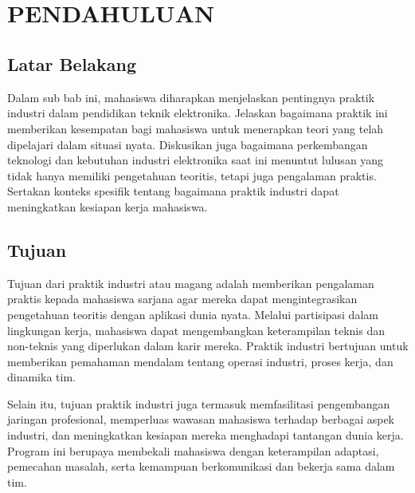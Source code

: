
\chapter[PENDAHULUAN]{\\ PENDAHULUAN}

\section{Latar Belakang}
Dalam sub bab ini, mahasiswa diharapkan menjelaskan pentingnya praktik industri dalam pendidikan teknik elektronika. Jelaskan bagaimana praktik ini memberikan kesempatan bagi mahasiswa untuk menerapkan teori yang telah dipelajari dalam situasi nyata. Diskusikan juga bagaimana perkembangan teknologi dan kebutuhan industri elektronika saat ini menuntut lulusan yang tidak hanya memiliki pengetahuan teoritis, tetapi juga pengalaman praktis. Sertakan konteks spesifik tentang bagaimana praktik industri dapat meningkatkan kesiapan kerja mahasiswa.

\section{Tujuan \tipe}
Tujuan dari praktik industri atau magang adalah memberikan pengalaman praktis kepada mahasiswa sarjana agar mereka dapat mengintegrasikan pengetahuan teoritis dengan aplikasi dunia nyata. Melalui partisipasi dalam lingkungan kerja, mahasiswa dapat mengembangkan keterampilan teknis dan non-teknis yang diperlukan dalam karir mereka. Praktik industri bertujuan untuk memberikan pemahaman mendalam tentang operasi industri, proses kerja, dan dinamika tim.

Selain itu, tujuan praktik industri juga termasuk memfasilitasi pengembangan jaringan profesional, memperluas wawasan mahasiswa terhadap berbagai aspek industri, dan meningkatkan kesiapan mereka menghadapi tantangan dunia kerja. Program ini berupaya membekali mahasiswa dengan keterampilan adaptasi, pemecahan masalah, serta kemampuan berkomunikasi dan bekerja sama dalam tim.

